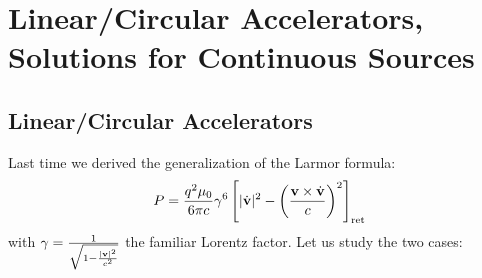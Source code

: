 \section{Linear/Circular Accelerators, Solutions for Continuous Sources}

\subsection{Linear/Circular Accelerators}
Last time we derived the generalization of the Larmor formula:
\begin{equation}
    P = \frac{q^2\mu_0}{6\pi c}\gamma^6\left[\lvert \dot{\mathbf{v}} \rvert^2 - \left(\frac{\mathbf{v} \times \dot{\mathbf{v}}}{c}\right)^2\right]_{\text{ret}}
\end{equation}
with $\gamma = \frac{1}{\sqrt{1- \frac{\lvert \mathbf{v} \rvert^2}{c^2}}}$ the familiar Lorentz factor. Let us study the two cases:

